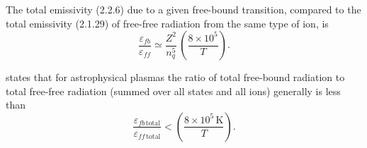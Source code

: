 The total emissivity (2.2.6) due to a given free-bound transition, compared
to the total emissivity (2.1.29) of free-free radiation from the same type of ion,
is
\begin{equation}
\frac{\varepsilon_{fb}}{\varepsilon_{ff}}
\simeq \frac{Z^2}{n_q^5}\,
\left(\frac{8 \times 10^5}{T}\right).
\tag{2.2.8}
\end{equation}

\citet{Ginzburg1967} states that for astrophysical plasmas the ratio of total free-bound
radiation to total free-free radiation (summed over all states and all ions)
generally is less than
\begin{equation}
\frac{\varepsilon_{fb\,\text{total}}}{\varepsilon_{ff\,\text{total}}}
< \left(\frac{8 \times 10^5\,\text{K}}{T}\right).
\tag{2.2.9}
\end{equation}
